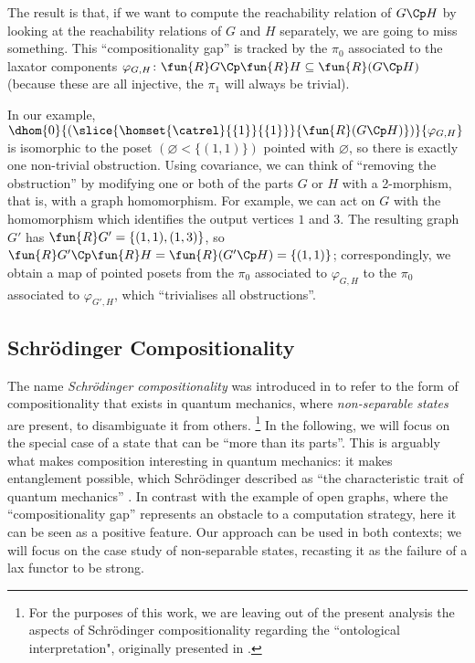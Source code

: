 The result is that, if we want to compute the reachability relation of $G \Cp H$ by looking at the reachability relations of $G$ and $H$ separately, we are going to miss something.
This ``compositionality gap'' is tracked by the $\pi_0$ associated to the laxator components $\varphi_{G, H}\colon \fun{R}G \Cp \fun{R}H \subseteq \fun{R}(G \Cp H)$ (because these are all injective, the $\pi_1$ will always be trivial).

In our example, $\dhom{0}{(\slice{\homset{\catrel}{\{1\}}{\{1\}}}{\fun{R}(G\Cp H)})}{\varphi_{G,H}}$ is isomorphic to the poset $(\varnothing < \{(1, 1)\})$ pointed with $\varnothing$, so there is exactly one non-trivial obstruction.
Using covariance, we can think of ``removing the obstruction'' by modifying one or both of the parts $G$ or $H$ with a 2-morphism, that is, with a graph homomorphism.
For example, we can act on $G$ with the homomorphism which identifies the output vertices $1$ and $3$.
The resulting graph $G'$ has $\fun{R}G' = \{(1, 1), (1, 3)\}$, so $\fun{R}G' \Cp \fun{R}H = \fun{R}(G' \Cp H) = \{(1, 1)\}$; correspondingly, we obtain a map of pointed posets from the $\pi_0$ associated to $\varphi_{G, H}$ to the $\pi_0$ associated to $\varphi_{G', H}$, which ``trivialises all obstructions''.
%
%
\subsection{Schr\"odinger Compositionality}\label{subsec: schrodinger compositionality}

The name \emph{Schr\"odinger compositionality} was introduced in \cite{coecke2021compositionality} to refer to the form of compositionality that exists in quantum mechanics, where \emph{non-separable states} are present, to disambiguate it from others.
\footnote{For the purposes of this work, we are leaving out of the present analysis the aspects of Schr\"odinger compositionality regarding the  ``ontological interpretation", originally presented in  \cite{coecke2021compositionality}.}
In the following, we will focus on the special case of a state that can be ``more than its parts''.
This is arguably what makes composition interesting in quantum mechanics: it makes entanglement possible, which Schr\"odinger described as ``the characteristic trait of quantum mechanics'' \cite{Schrodinger_1935}.
In contrast with the example of open graphs, where the ``compositionality gap'' represents an obstacle to a computation strategy, here it can be seen as a positive feature.
Our approach can be used in both contexts; we will focus on the case study of non-separable states, recasting it as the failure of a lax functor to be strong.

